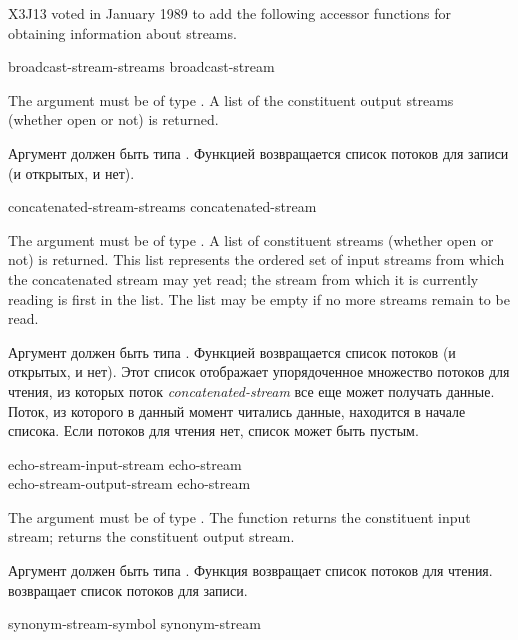 \begin{new}
X3J13 voted in January 1989
to add the following accessor functions
for obtaining information about streams.


\begin{defun}[Function]
broadcast-stream-streams broadcast-stream

The argument must be of type .
A list of the constituent output streams (whether open or not) is returned.

Аргумент должен быть типа .
Функцией возвращается список потоков для записи (и открытых, и нет).
\end{defun}


\begin{defun}[Function]
concatenated-stream-streams concatenated-stream

The argument must be of type .
A list of constituent streams (whether open or not) is returned.
This list represents the ordered set of input streams from which
the concatenated stream may yet read; the stream from which it is
currently reading is first in the list.  The list may be empty
if no more streams remain to be read.

Аргумент должен быть типа .
Функцией возвращается список потоков (и открытых, и нет).
Этот список отображает упорядоченное множество потоков для чтения, из которых
поток \emph{concatenated-stream} все еще может получать данные. Поток, из
которого в данный момент читались данные, находится в начале списока.
Если потоков для чтения нет, список может быть пустым.
\end{defun}


\begin{defun}[Function]
echo-stream-input-stream echo-stream \\
echo-stream-output-stream echo-stream

The argument must be of type .
The function  returns the constituent
input stream;  returns the constituent
output stream.

Аргумент должен быть типа .
Функция  возвращает список потоков для чтения.
 возвращает список потоков для записи.
\end{defun}


\begin{defun}[Function]
synonym-stream-symbol synonym-stream


\end{defun}
\end{new}
